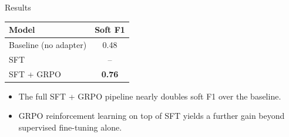 \begin{frame}{Results}
  \begin{table}
    \centering
    \begin{tabular}{lc}
      \toprule
      Model & Soft F1 \\
      \midrule
      Baseline (no adapter) & 0.48 \\
      SFT & -- \\
      SFT + GRPO & \textbf{0.76} \\
      \bottomrule
    \end{tabular}
  \end{table}
  \vfill
  \begin{itemize}
    \item The full SFT + GRPO pipeline nearly doubles soft F1 over the baseline.
    \item GRPO reinforcement learning on top of SFT yields a further gain beyond supervised fine-tuning alone.
  \end{itemize}
\end{frame}
